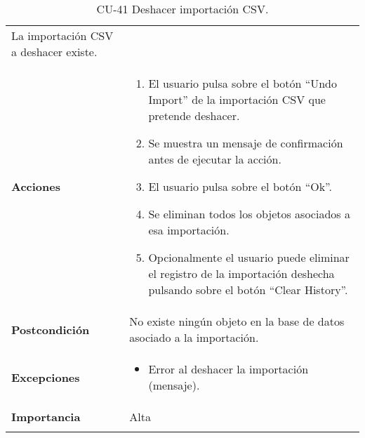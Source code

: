 \begin{longtable}[]{@{}ll@{}}
\begin{minipage}[t]{0.78\columnwidth}
La importación CSV a deshacer existe.\strut
\end{minipage}\tabularnewline
\begin{minipage}[t]{0.16\columnwidth}\raggedright
\textbf{Acciones}\strut
\end{minipage} & \begin{minipage}[t]{0.78\columnwidth}\raggedright
\begin{enumerate}
\def\labelenumi{\arabic{enumi}.}
\tightlist
\item
  El usuario pulsa sobre el botón ``Undo Import'' de la importación CSV
  que pretende deshacer.
\item
  Se muestra un mensaje de confirmación antes de ejecutar la acción.
\item
  El usuario pulsa sobre el botón ``Ok''.
\item
  Se eliminan todos los objetos asociados a esa importación.
\item
  Opcionalmente el usuario puede eliminar el registro de la importación
  deshecha pulsando sobre el botón ``Clear History''.
\end{enumerate}\strut
\end{minipage}\tabularnewline
\begin{minipage}[t]{0.16\columnwidth}\raggedright
\textbf{Postcondición}\strut
\end{minipage} & \begin{minipage}[t]{0.78\columnwidth}\raggedright
No existe ningún objeto en la base de datos asociado a la
importación.\strut
\end{minipage}\tabularnewline
\begin{minipage}[t]{0.16\columnwidth}\raggedright
\textbf{Excepciones}\strut
\end{minipage} & \begin{minipage}[t]{0.78\columnwidth}\raggedright
\begin{itemize}
\tightlist
\item
  Error al deshacer la importación (mensaje).
\end{itemize}\strut
\end{minipage}\tabularnewline
\begin{minipage}[t]{0.16\columnwidth}\raggedright
\textbf{Importancia}\strut
\end{minipage} & \begin{minipage}[t]{0.78\columnwidth}\raggedright
Alta\strut
\end{minipage}\tabularnewline
\bottomrule
\caption{CU-41 Deshacer importación CSV.}
\end{longtable}


